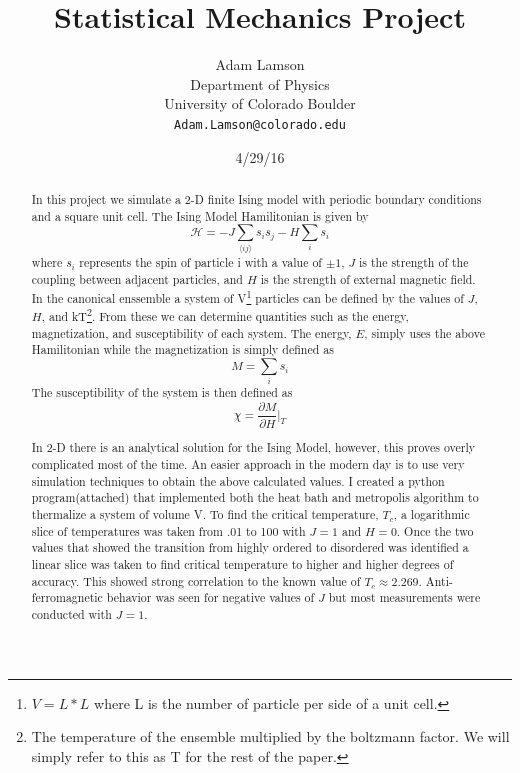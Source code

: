 \documentclass[a4paper,11pt]{article}
\title{Statistical Mechanics Project}
\author{Adam Lamson\\
Department of Physics\\
University of Colorado Boulder\\
\texttt{Adam.Lamson@colorado.edu}}
\date{4/29/16}
\begin{document}
\maketitle

\begin{center}
\end{center}

\tableofcontents

\begin{abstract}
    In this project we simulate a 2-D finite Ising model with periodic boundary conditions and a square unit cell. The Ising Model Hamilitonian is given by
    \begin{equation}
        \mathcal{H} = -J \sum_{\langle ij \rangle} s_i s_j - H\sum_i s_i
    \end{equation}
    where $s_i$ represents the spin of particle i with a value of $\pm1$, $J$ is the strength of the coupling between adjacent particles, and $H$ is the strength of external magnetic field. In the canonical enssemble a system of V\footnote{$V=L*L$ where L is the number of particle per side of a unit cell.} particles can be defined by the values of $J$, $H$, and kT\footnote{The temperature of the ensemble multiplied by the boltzmann factor. We will simply refer to this as T for the rest of the paper.}. From these we can determine quantities such as the energy, magnetization, and susceptibility of each system. The energy, $E$, simply uses the above Hamilitonian while the magnetization is simply defined as 
    \begin{equation}
        M = \sum_i s_i
    \end{equation}
The susceptibility of the system is then defined as 
    \begin{equation}
        \chi = \frac{\partial M}{\partial H}\bigg\vert_T 
    \end{equation}

    In 2-D there is an analytical solution for the Ising Model, however, this proves overly complicated most of the time. An easier approach in the modern day is to use very simulation techniques to obtain the above calculated values. I created a python program(attached) that implemented both the heat bath and metropolis algorithm to thermalize a system of volume V. To find the critical temperature, $T_c$, a logarithmic slice of temperatures was taken from .01 to 100 with $J=1$ and $H=0$. Once the two values that showed the transition from highly ordered to disordered was identified a linear slice was taken to find critical temperature to higher and higher degrees of accuracy. This showed strong correlation to the known value of $T_c \approx 2.269$. Anti-ferromagnetic behavior was seen for negative values of $J$ but most measurements were conducted with $J=1$.

\end{abstract}
\end{document}
